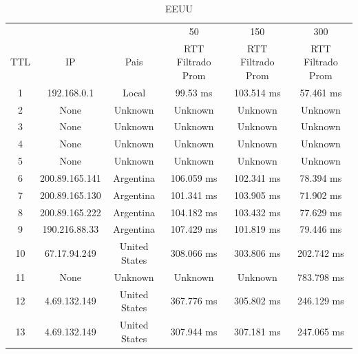 \begin{table}[]
\centering
\caption{EEUU}
\begin{tabular}{ | c | c | c | c | c | c | }
	\hline 
  & & & 50	& 150	& 300 \\ %
TTL	&          IP         	     &    Pais        & 	 RTT Filtrado Prom  	&  RTT Filtrado Prom  & 	 RTT Filtrado Prom  \\ \hline  
1	& 192.168.0.1       &   	       Local      &   	       99.53 ms    &  	     103.514 ms   &   	      57.461 ms   \\ \hline    
2	& None               &  	      Unknown     &   	      Unknown      &  	      Unknown     &   	      Unknown     \\ \hline    
3	& None               &  	      Unknown     &   	      Unknown      &  	      Unknown     &   	      Unknown     \\ \hline    
4	& None               &  	      Unknown     &   	      Unknown      &  	      Unknown     &   	      Unknown     \\ \hline    
5	& None               &  	      Unknown     &   	      Unknown      &  	      Unknown     &   	      Unknown     \\ \hline    
6	& 200.89.165.141    &   	     Argentina    &   	     106.059 ms    &  	     102.341 ms   &   	      78.394 ms   \\ \hline    
7	& 200.89.165.130    &   	     Argentina    &   	     101.341 ms    &  	     103.905 ms   &   	      71.902 ms   \\ \hline    
8	& 200.89.165.222    &   	     Argentina    &   	     104.182 ms    &  	     103.432 ms   &   	      77.629 ms   \\ \hline    
9	& 190.216.88.33     &   	     Argentina    &   	     107.429 ms    &  	     101.819 ms   &   	      79.446 ms   \\ \hline    
10	& 67.17.94.249     &    	   United States  &   	     308.066 ms    &  	     303.806 ms   &   	     202.742 ms   \\ \hline    
11	& None               &  	      Unknown     &   	      Unknown      &  	      Unknown     &   	     783.798 ms   \\ \hline    
12	& 4.69.132.149    &     	   United States  &   	     367.776 ms    &  	     305.802 ms   &   	     246.129 ms   \\ \hline    
13	& 4.69.132.149    &     	   United States  &   	     307.944 ms    &  	     307.181 ms   &   	     247.065 ms   \\ \hline    

\end{tabular}
\end{table}
